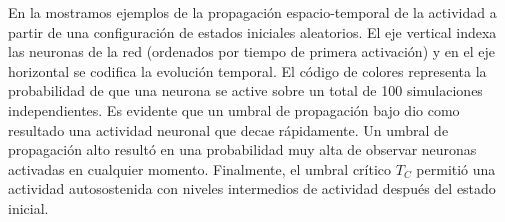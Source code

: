 En la  mostramos ejemplos de la propagación espacio-temporal de la actividad a partir de una configuración de estados iniciales aleatorios. El eje vertical indexa las neuronas de la red (ordenados por tiempo de primera activación) y en el eje horizontal se codifica la evolución temporal. El código de colores representa la probabilidad de que una neurona  se active sobre un total de 100 simulaciones independientes. Es evidente que un umbral de propagación bajo dio como resultado una  actividad neuronal que decae rápidamente. Un umbral de propagación alto resultó en una probabilidad muy alta de observar neuronas activadas en cualquier momento. Finalmente, el umbral crítico $T_C$ permitió una actividad autosostenida con niveles intermedios de actividad después del estado inicial. 



